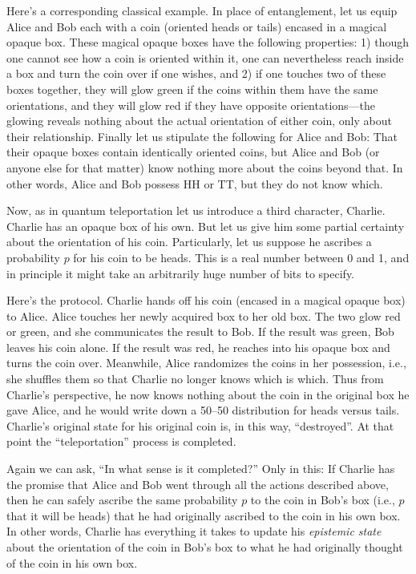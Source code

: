 \documentclass[aps,pra,superscriptaddress,10pt,tightenlines,twocolumn,nofootinbib]{revtex4}
\begin{document}
Here's a corresponding classical example.  In place of entanglement,
let us equip Alice and Bob each with a coin (oriented heads or tails)
encased in a magical opaque box.  These magical opaque boxes have the
following properties:  1) though one cannot see how a coin is
oriented within it, one can nevertheless reach inside a box and turn
the coin over if one wishes, and 2) if one touches two of these boxes
together, they will glow green if the coins within them have the same
orientations, and they will glow red if they have opposite
orientations---the glowing reveals nothing about the actual
orientation of either coin, only about their relationship.  Finally
let us stipulate the following for Alice and Bob:  That their opaque
boxes contain identically oriented coins, but Alice and Bob (or
anyone else for that matter) know nothing more about the coins beyond
that.  In other words, Alice and Bob possess HH or TT, but they do
not know which.

Now, as in quantum teleportation let us introduce a third character,
Charlie.  Charlie has an opaque box of his own.  But let us give him
some partial certainty about the orientation of his coin.
Particularly, let us suppose he ascribes a probability $p$ for his
coin to be heads.  This is a real number between 0 and 1, and in
principle it might take an arbitrarily huge number of bits to specify.

Here's the protocol.  Charlie hands off his coin (encased in a magical
opaque box) to Alice.  Alice touches her newly acquired box to her old
box.  The two glow red or green, and she communicates the result to
Bob.  If the result was green, Bob leaves his coin alone.  If the
result was red, he reaches into his opaque box and turns the coin
over.  Meanwhile, Alice randomizes the coins in her possession, i.e.,
she shuffles them so that Charlie no longer knows which is which.
Thus from Charlie's perspective, he now knows nothing about the coin
in the original box he gave Alice, and he would write down a 50--50
distribution for heads versus tails.  Charlie's original state for his
original coin is, in this way, ``destroyed''.  At that point the
``teleportation'' process is completed.

Again we can ask, ``In what sense is it completed?''  Only in this:
If Charlie has the promise that Alice and Bob went through all the
actions described above, then he can safely ascribe the same
probability $p$ to the coin in Bob's box (i.e., $p$ that it will be
heads) that he had originally ascribed to the coin in his own box.  In
other words, Charlie has everything it takes to update his {\it
  epistemic state\/} about the orientation of the coin in Bob's box to
what he had originally thought of the coin in his own box.
\end{document}
